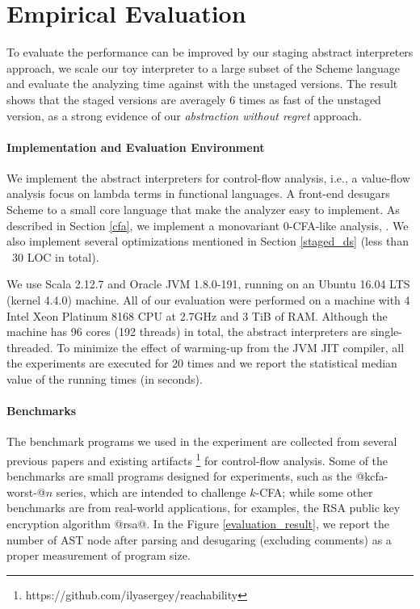 \section{Empirical Evaluation} \label{evaluation}

To evaluate the performance can be improved by our staging abstract interpreters
approach, we scale our toy interpreter to a large subset of the Scheme language
and evaluate the analyzing time against with the unstaged versions. The result
shows that the staged versions are averagely 6 times as fast of the unstaged
version, as a strong evidence of our \textit{abstraction without regret}
approach.

\paragraph{Implementation and Evaluation Environment}
We implement the abstract interpreters for control-flow analysis, i.e., a
value-flow analysis focus on lambda terms in functional languages. A front-end
desugars Scheme to a small core language that make the analyzer easy to
implement. As described in Section \ref{cfa}, we implement a monovariant
0-CFA-like analysis, . We also implement several
optimizations mentioned in Section \ref{staged_ds} (less than ~30 LOC in total).

We use Scala 2.12.7 and Oracle JVM 1.8.0-191, running on an Ubuntu 16.04 LTS
(kernel 4.4.0) machine. All of our evaluation were performed on a machine with 4 Intel
Xeon Platinum 8168 CPU at 2.7GHz and 3 TiB of RAM. Although the machine has 96
cores (192 threads) in total, the abstract interpreters are single-threaded.
To minimize the effect of warming-up from the JVM JIT compiler, all the
experiments are executed for 20 times and we report the statistical median value
of the running times (in seconds).

\paragraph{Benchmarks}
The benchmark programs we used in the experiment are collected from several
previous papers \cite{Johnson:2013:OAA:2500365.2500604, ashley:practical,
DBLP:journals/corr/abs-1102-3676} and existing artifacts
\footnote{https://github.com/ilyasergey/reachability} for control-flow analysis.
Some of the benchmarks are small programs designed for experiments, such as the
@kcfa-worst-@$n$ series, which are intended to challenge $k$-CFA; while some
other benchmarks are from real-world applications, for examples, the RSA public
key encryption algorithm @rsa@. In the Figure \ref{evaluation_result}, we report
the number of AST node after parsing and desugaring (excluding comments) as a
proper measurement of program size.

